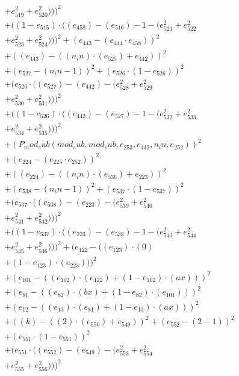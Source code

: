 \documentclass[10pt, a4paper]{article}
\begin{document}
\begin{small}
\begin{align*}
& + e_{519}^{2} + e_{520}^{2})))^{2} \\
& + ((1 - e_{515})  \cdot  ((e_{458}) - (e_{516}) - 1 - (e_{521}^{2} + e_{522}^{2} \\
& + e_{523}^{2} + e_{524}^{2})))^{2} + (e_{443} - (e_{444}  \cdot  e_{458}))^{2} \\
& + ((e_{443}) - ((n_in)  \cdot  (e_{525}) + e_{442}))^{2} \\
& + (e_{527} - (n_in - 1))^{2} + (e_{526}  \cdot  (1 - e_{526}))^{2} \\
& + (e_{526}  \cdot  ((e_{527}) - (e_{442}) - (e_{528}^{2} + e_{529}^{2} \\
& + e_{530}^{2} + e_{531}^{2})))^{2} \\
& + ((1 - e_{526})  \cdot  ((e_{442}) - (e_{527}) - 1 - (e_{532}^{2} + e_{533}^{2} \\
& + e_{534}^{2} + e_{535}^{2})))^{2} \\
& + (P_mod_sub(mod_sub, mod_sub, e_{253}, e_{442}, n_in, e_{252}))^{2} \\
& + (e_{224} - (e_{225}  \cdot  e_{252}))^{2} \\
& + ((e_{224}) - ((n_in)  \cdot  (e_{536}) + e_{223}))^{2} \\
& + (e_{538} - (n_in - 1))^{2} + (e_{537}  \cdot  (1 - e_{537}))^{2} \\
& + (e_{537}  \cdot  ((e_{538}) - (e_{223}) - (e_{539}^{2} + e_{540}^{2} \\
& + e_{541}^{2} + e_{542}^{2})))^{2} \\
& + ((1 - e_{537})  \cdot  ((e_{223}) - (e_{538}) - 1 - (e_{543}^{2} + e_{544}^{2} \\
& + e_{545}^{2} + e_{546}^{2})))^{2} + (e_{122} - ((e_{123})  \cdot  (0) \\
& + (1 - e_{123})  \cdot  (e_{223})))^{2} \\
& + (e_{101} - ((e_{102})  \cdot  (e_{122}) + (1 - e_{102})  \cdot  (ax)))^{2} \\
& + (e_{81} - ((e_{82})  \cdot  (bx) + (1 - e_{82})  \cdot  (e_{101})))^{2} \\
& + (e_{12} - ((e_{13})  \cdot  (e_{81}) + (1 - e_{13})  \cdot  (ax)))^{2} \\
& + ((k) - ((2)  \cdot  (e_{550}) + e_{549}))^{2} + (e_{552} - (2 - 1))^{2} \\
& + (e_{551}  \cdot  (1 - e_{551}))^{2} \\
& + (e_{551}  \cdot  ((e_{552}) - (e_{549}) - (e_{553}^{2} + e_{554}^{2} \\
& + e_{555}^{2} + e_{556}^{2})))^{2} \\

\end{align*}
\end{small}
\end{document}
